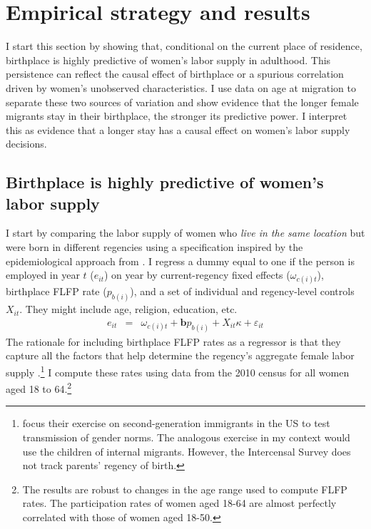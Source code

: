 \section{Empirical strategy and results}
\label{sec:empirical_strategy}
I start this section by showing that, conditional on the current place of residence, birthplace is highly predictive of women's labor supply in adulthood. This persistence can reflect the causal effect of birthplace or a spurious correlation driven by women's unobserved characteristics. I use data on age at migration to separate these two sources of variation and show evidence that the longer female migrants stay in their birthplace, the stronger its predictive power. I interpret this as evidence that a longer stay has a causal effect on women's labor supply decisions.


\subsection{Birthplace is highly predictive of women's labor supply}	
\label{sec:explanation}
I start by comparing the labor supply of women who \textit{live in the same location} but were born in different regencies using a specification inspired by the epidemiological approach from \cite{Fernandez2009}. I regress a dummy equal to one if the person is employed in year $t$ ($ e_{it}$) on year by current-regency fixed effects  ($\omega_{c(i)t}$), birthplace FLFP rate ($p_{b(i)}$), and a set of individual and regency-level controls $X_{it}$. They might include age, religion, education, etc.
\begin{eqnarray}
	\label{eq:childhood_main}
	e_{it}&=&\omega_{c(i)t}+\boldsymbol b p_{b(i)}+X_{it}\kappa+\varepsilon_{it}
\end{eqnarray}
The rationale for including birthplace FLFP rates as a regressor is that they capture all the factors that help determine the regency's aggregate female labor supply \citep{Fernandez2009}.\footnote{\cite{Fernandez2009} focus their exercise on second-generation immigrants in the US to test transmission of gender norms. The analogous exercise in my context would use the children of internal migrants. However, the Intercensal Survey does not track parents' regency of birth.} I compute these rates using data from the 2010 census for all women aged 18 to 64.\footnote{The results are robust to changes in the age range used to compute FLFP rates. The participation rates of women aged 18-64 are almost perfectly correlated with those of women aged 18-50.}

